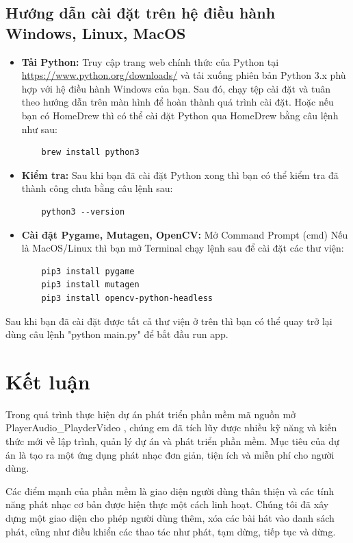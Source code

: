 \documentclass[a4paper]{article}
\begin{document}
\subsection{Hướng dẫn cài đặt trên hệ điều hành Windows, Linux, MacOS}
\begin{itemize}
    \item \textbf{Tải Python:} Truy cập trang web chính thức của Python tại \url{https://www.python.org/downloads/} và tải xuống phiên bản Python 3.x phù hợp với hệ điều hành Windows của bạn. Sau đó, chạy tệp cài đặt và tuân theo hướng dẫn trên màn hình để hoàn thành quá trình cài đặt. Hoặc nếu bạn có HomeDrew thì có thể cài đặt Python qua HomeDrew bằng câu lệnh như sau:    
    \begin{verbatim}
    brew install python3
    \end{verbatim} 
     \item \textbf{Kiểm tra:} Sau khi bạn đã cài đặt Python xong thì bạn có thể kiểm tra đã thành công chưa bằng câu lệnh sau:
    \begin{verbatim}
    python3 --version
    \end{verbatim}
    \item \textbf{Cài đặt Pygame, Mutagen, OpenCV:} Mở Command Prompt (cmd) Nếu là MacOS/Linux thì bạn mở Terminal chạy lệnh sau để cài đặt các thư viện:
    \begin{verbatim}
    pip3 install pygame
    pip3 install mutagen
    pip3 install opencv-python-headless
    \end{verbatim}   
\end{itemize}
\hspace*{0.5cm} Sau khi bạn đã cài đặt được tất cả thư viện ở trên thì bạn có thể quay trở lại dùng câu lệnh "python main.py" để bắt đầu run app.

\section{Kết luận}

\hspace Trong quá trình thực hiện dự án phát triển phần mềm mã nguồn mở  PlayerAudio\_PlayderVideo , chúng em đã tích lũy được nhiều kỹ năng và kiến thức mới về lập trình, quản lý dự án và phát triển phần mềm. Mục tiêu của dự án là tạo ra một ứng dụng phát nhạc đơn giản, tiện ích và miễn phí cho người dùng.

\hspace Các điểm mạnh của phần mềm là giao diện người dùng thân thiện và các tính năng phát nhạc cơ bản được hiện thực một cách linh hoạt. Chúng tôi đã xây dựng một giao diện cho phép người dùng thêm, xóa các bài hát vào danh sách phát, cũng như điều khiển các thao tác như phát, tạm dừng, tiếp tục và dừng.
\end{document}
